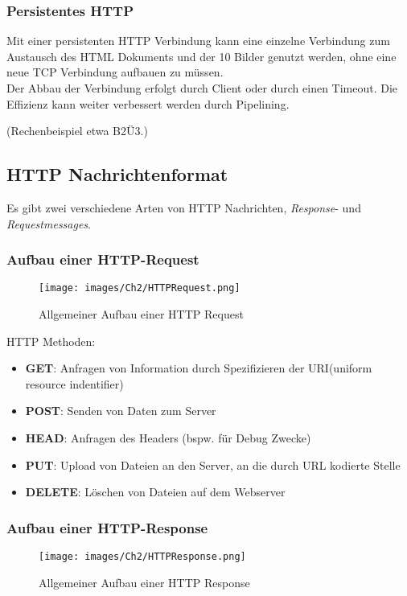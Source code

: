 \subsubsection{Persistentes HTTP}
Mit einer persistenten HTTP Verbindung kann eine einzelne Verbindung zum Austausch des HTML Dokuments und der 10 Bilder genutzt werden, ohne eine neue TCP Verbindung aufbauen zu müssen.\\
\noindent Der Abbau der Verbindung erfolgt durch Client oder durch einen Timeout. Die Effizienz kann weiter verbessert werden durch Pipelining.

\noindent
(Rechenbeispiel etwa B2Ü3.)

\subsection{HTTP Nachrichtenformat}
Es gibt zwei verschiedene Arten von HTTP Nachrichten, \emph{Response}- und \emph{Requestmessages}.

\subsubsection{Aufbau einer HTTP-Request}
\begin{figure}[H]
    \centering
    \texttt{[image: images/Ch2/HTTPRequest.png]}
    \caption{Allgemeiner Aufbau einer HTTP Request}
\end{figure}

HTTP Methoden:
\begin{itemize}
    \item \textbf{GET}: Anfragen von Information durch Spezifizieren der URI(uniform resource indentifier)
    \item \textbf{POST}: Senden von Daten zum Server
    \item \textbf{HEAD}: Anfragen des Headers (bspw. für Debug Zwecke)
    \item \textbf{PUT}: Upload von Dateien an den Server, an die durch URL kodierte Stelle
    \item \textbf{DELETE}: Löschen von Dateien auf dem Webserver
\end{itemize}

\subsubsection{Aufbau einer HTTP-Response}
\begin{figure}[H]
    \centering
    \texttt{[image: images/Ch2/HTTPResponse.png]}
    \caption{Allgemeiner Aufbau einer HTTP Response}
\end{figure}


